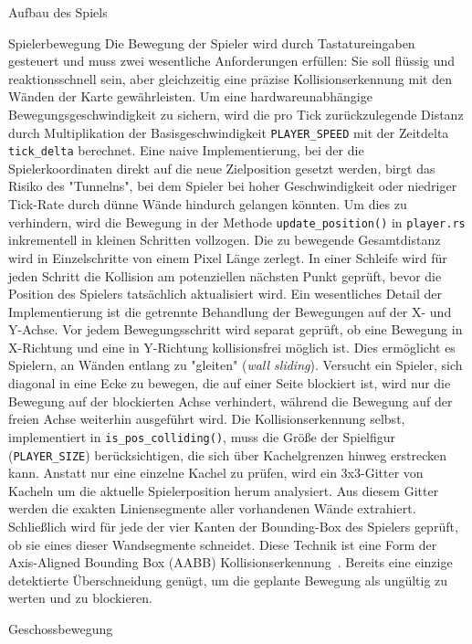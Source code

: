 \begin{section}{Aufbau des Spiels}
\begin{subsection}{Spielerbewegung}
Die Bewegung der Spieler wird durch Tastatureingaben gesteuert und muss zwei wesentliche Anforderungen erfüllen: Sie soll flüssig und reaktionsschnell sein, aber gleichzeitig eine präzise Kollisionserkennung mit den Wänden der Karte gewährleisten.
Um eine hardwareunabhängige Bewegungsgeschwindigkeit zu sichern, wird die pro Tick zurückzulegende Distanz durch Multiplikation der Basisgeschwindigkeit \texttt{PLAYER\_SPEED} mit der Zeitdelta \texttt{tick\_delta} berechnet.
Eine naive Implementierung, bei der die Spielerkoordinaten direkt auf die neue Zielposition gesetzt werden, birgt das Risiko des "Tunnelns", bei dem Spieler bei hoher Geschwindigkeit oder niedriger Tick-Rate durch dünne Wände hindurch gelangen könnten.
Um dies zu verhindern, wird die Bewegung in der Methode \texttt{update\_position()} in \texttt{player.rs} inkrementell in kleinen Schritten vollzogen.
Die zu bewegende Gesamtdistanz wird in Einzelschritte von einem Pixel Länge zerlegt.
In einer Schleife wird für jeden Schritt die Kollision am potenziellen nächsten Punkt geprüft, bevor die Position des Spielers tatsächlich aktualisiert wird.
Ein wesentliches Detail der Implementierung ist die getrennte Behandlung der Bewegungen auf der X- und Y-Achse.
Vor jedem Bewegungsschritt wird separat geprüft, ob eine Bewegung in X-Richtung und eine in Y-Richtung kollisionsfrei möglich ist.
Dies ermöglicht es Spielern, an Wänden entlang zu "gleiten" (\textit{wall sliding}).
Versucht ein Spieler, sich diagonal in eine Ecke zu bewegen, die auf einer Seite blockiert ist, wird nur die Bewegung auf der blockierten Achse verhindert, während die Bewegung auf der freien Achse weiterhin ausgeführt wird.
Die Kollisionserkennung selbst, implementiert in \texttt{is\_pos\_colliding()}, muss die Größe der Spielfigur (\texttt{PLAYER\_SIZE}) berücksichtigen, die sich über Kachelgrenzen hinweg erstrecken kann.
Anstatt nur eine einzelne Kachel zu prüfen, wird ein 3x3-Gitter von Kacheln um die aktuelle Spielerposition herum analysiert.
Aus diesem Gitter werden die exakten Liniensegmente aller vorhandenen Wände extrahiert.
Schließlich wird für jede der vier Kanten der Bounding-Box des Spielers geprüft, ob sie eines dieser Wandsegmente schneidet.
Diese Technik ist eine Form der Axis-Aligned Bounding Box (AABB) Kollisionserkennung~\cite{mdn_aabb_collision}.
Bereits eine einzige detektierte Überschneidung genügt, um die geplante Bewegung als ungültig zu werten und zu blockieren.
\end{subsection}

\begin{subsection}{Geschossbewegung}


\end{subsection}
\end{section}
